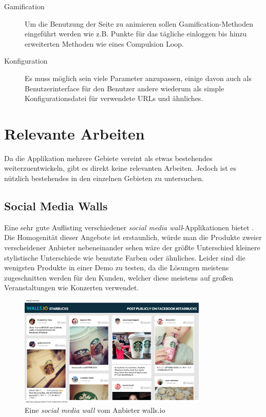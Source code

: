 \documentclass[12pt,twoside]{book}
\begin{document}
\begin{description}
\item[Gamification]
  Um die Benutzung der Seite zu animieren sollen Gamification-Methoden eingeführt werden wie z.B. Punkte für das tägliche einloggen bis hinzu erweiterten Methoden wie eines Compulsion Loop.

\item[Konfiguration]
  Es muss möglich sein viele Parameter anzupassen, einige davon auch als Benutzerinterface für den Benutzer andere wiederum als simple Konfigurationsdatei für verwendete URLs und ähnliches.

\end{description}

\section{Relevante Arbeiten}

Da die Applikation mehrere Gebiete vereint als etwas bestehendes weiterzuentwickeln, gibt es direkt keine relevanten Arbeiten. Jedoch ist es nützlich bestehendes in den einzelnen Gebieten zu untersuchen.

\subsection{Social Media Walls}

Eine sehr gute Auflisting verschiedener \textit{social media wall}-Applikationen bietet \citep{hofram}. Die Homogenität dieser Angebote ist erstaunlich, würde man die Produkte zweier verscheidener Anbieter nebeneinander sehen wäre der größte Unterschied kleinere stylistische Unterschiede wie benutzte Farben oder ähnliches. Leider sind die wenigsten Produkte in einer Demo zu testen, da die Lösungen meistens zugeschnitten werden für den Kunden, welcher diese meistens auf großen Veranstaltungen wie Konzerten verwendet. \\

\begin{figure}[H]
    \centering
    \includegraphics[width=0.8\textwidth]{images/Starbucks.png}
    \caption{Eine \textit{social media wall} vom Anbieter walls.io}
    \label{fig:awesome_image}
\end{figure}
\end{document}
